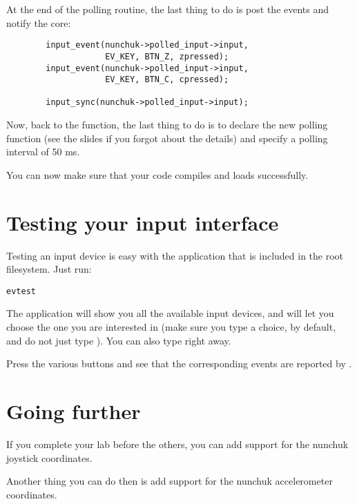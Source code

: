 At the end of the polling routine, the last thing to do is post the events 
and notify the  core:

\begin{verbatim}
        input_event(nunchuk->polled_input->input,
                    EV_KEY, BTN_Z, zpressed);
        input_event(nunchuk->polled_input->input,
                    EV_KEY, BTN_C, cpressed);

        input_sync(nunchuk->polled_input->input);
\end{verbatim}

Now, back to the  function, the last thing to do
is to declare the new polling function (see the slides if you forgot
about the details) and specify a polling interval of 50 ms.

You can now make sure that your code compiles and loads successfully.

\section{Testing your input interface}

Testing an input device is easy with the  application
that is included in the root filesystem. Just run:

\begin{verbatim}
evtest
\end{verbatim}

The application will show you all the available input devices, and will let
you choose the one you are interested in (make sure you type a choice,
 by default, and do not just type \code{[Enter]}). You can also
type  right away.

Press the various buttons and see that the corresponding events are
reported by .

\section{Going further}

If you complete your lab before the others, you can add support for the
nunchuk joystick coordinates.

Another thing you can do then is add support for the nunchuk accelerometer
coordinates.
